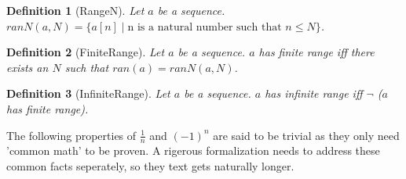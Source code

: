 \documentclass{article}
\newenvironment{forthel}{\begin{leftbar}}{\end{leftbar}}
\newtheorem{definition}{Definition}
\begin{document}
\begin{forthel}
	\begin{definition}[RangeN] Let $a$ be a sequence. \\ $ranN(a,N) = \{a[n] \mid \text{n is a natural number such that } n \leq N\}$. 
	\end{definition}
	
	\begin{definition}[FiniteRange]	Let $a$ be a sequence. $a$ has finite range iff there exists an $N$ such that $ran(a) = ranN(a,N)$.
	\end{definition}

	\begin{definition}[InfiniteRange] Let $a$ be a sequence. $a$ has infinite range iff $\neg$ ($a$ has finite range).
	\end{definition}
\end{forthel}

\noindent The following properties of $\frac{1}{n}$ and $(-1)^{n}$ are said to be trivial as they only need 'common math' to be proven. A rigerous formalization needs to address these common facts seperately, so they text gets naturally longer.
\end{document}
